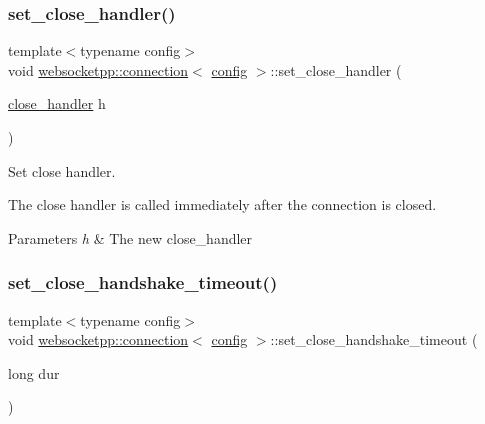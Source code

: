 \subsubsection{\texorpdfstring{set\+\_\+close\+\_\+handler()}{set\_close\_handler()}}
{\footnotesize\ttfamily template$<$typename config$>$ \\
void \mbox{\hyperlink{classwebsocketpp_1_1connection}{websocketpp\+::connection}}$<$ \mbox{\hyperlink{classconfig}{config}} $>$\+::set\+\_\+close\+\_\+handler (\begin{DoxyParamCaption}\item[{\mbox{\hyperlink{namespacewebsocketpp_a27acb39e01cbca06ccc4e4e8eb8f877d}{close\+\_\+handler}}}]{h }\end{DoxyParamCaption})\hspace{0.3cm}{\ttfamily [inline]}}



Set close handler. 

The close handler is called immediately after the connection is closed.


\begin{DoxyParams}{Parameters}
{\em h} & The new close\+\_\+handler \\
\hline
\end{DoxyParams}
\mbox{\label{classwebsocketpp_1_1connection_a3bf932388a128a7b719c45b945bffaad}} 
\subsubsection{\texorpdfstring{set\+\_\+close\+\_\+handshake\+\_\+timeout()}{set\_close\_handshake\_timeout()}}
{\footnotesize\ttfamily template$<$typename config$>$ \\
void \mbox{\hyperlink{classwebsocketpp_1_1connection}{websocketpp\+::connection}}$<$ \mbox{\hyperlink{classconfig}{config}} $>$\+::set\+\_\+close\+\_\+handshake\+\_\+timeout (\begin{DoxyParamCaption}\item[{long}]{dur }\end{DoxyParamCaption})\hspace{0.3cm}{\ttfamily [inline]}}




